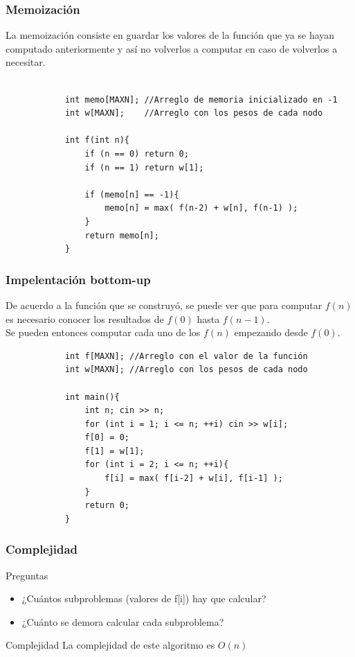 \documentclass{beamer}
\begin{document}
	\begin{frame}[fragile]
		\frametitle{Memoización}
		La memoización consiste en guardar los valores de la función que ya se hayan computado anteriormente y así no volverlos a computar en caso de volverlos a necesitar.\\ \quad \\
		\begin{lstlisting}
			int memo[MAXN]; //Arreglo de memoria inicializado en -1
			int w[MAXN];    //Arreglo con los pesos de cada nodo
			
			int f(int n){
			    if (n == 0) return 0;
			    if (n == 1) return w[1];
			
			    if (memo[n] == -1){
			        memo[n] = max( f(n-2) + w[n], f(n-1) );
			    }
			    return memo[n];
			}
		\end{lstlisting}
	\end{frame}
	
	\begin{frame}[fragile]
		\frametitle{Impelentación bottom-up}
		De acuerdo a la función que se construyó, se puede ver que para computar $f(n)$ es necesario conocer los resultados de $f(0)$ hasta $f(n-1)$.\\ Se pueden entonces computar cada uno de los $f(n)$ empezando desde $f(0)$. 
		\begin{lstlisting}
			int f[MAXN]; //Arreglo con el valor de la función
			int w[MAXN]; //Arreglo con los pesos de cada nodo
			
			int main(){
			    int n; cin >> n;
			    for (int i = 1; i <= n; ++i) cin >> w[i];
			    f[0] = 0;
			    f[1] = w[1];
			    for (int i = 2; i <= n; ++i){
			        f[i] = max( f[i-2] + w[i], f[i-1] );
			    }
			    return 0;
			}
		\end{lstlisting}
	\end{frame}
	
	\begin{frame}
		\frametitle{Complejidad}
		\begin{alertblock}{Preguntas}
			\begin{itemize}
				\item ¿Cuántos subproblemas (valores de f[i]) hay que calcular?
				\item ¿Cuánto se demora calcular cada subproblema?
			\end{itemize}
		\end{alertblock}	
		\pause
		\begin{block}{Complejidad}
			La complejidad de este algoritmo es $O(n)$
		\end{block}
	\end{frame}
\end{document}
